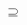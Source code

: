 \documentclass{standalone}
\newcommand*\zhparaleq{%
  \mathrel{\text{%
    \tikz[baseline]
      \draw (0em,0ex) -- (.8em,0ex)
            (0em,.35ex) -- (.8em,.35ex)
            (.24em,.45ex) -- (.37em,1.5ex)
            (.43em,.45ex) -- (.56em,1.5ex);}}}
\newcommand*\zhparalogram{%
  \mathord{\text{%
    \tikz[baseline]
      \draw (0,.1ex) -- (.8em,.1ex) -- (1em,1.4ex) -- (.2em,1.4ex) -- cycle;}}}
\newcommand*\zhsimilar{%
    \mathrel{\text{%
    \raisebox{0.1ex}{%
    \tikz \draw[baseline] (-.17em,.45ex) arc (90:180:0.23em and 0.45ex) arc (180:270:0.45ex) .. controls (0,-.45ex) and (0em,.45ex) .. (.21em,.45ex) arc (90:0:0.45ex) arc (0:-90:0.23em and 0.45ex);%
    }%
}}}
\newcommand*\zhcongruent{%
    \mathrel{\text{%
    \tikz \draw[baseline] (-.22em,-.4ex) arc (-90:-285:0.4ex) (-.22em,-.4ex) .. controls (0,-.4ex) and (0,.4ex) .. (.22em,.4ex) arc (90:-105:0.4ex) (-.4em,-.75ex) -- (.4em,-.75ex) (-.4em,-1.1ex) -- (.4em,-1.1ex);%
}}}
\renewcommand\zhparallel{%
	\mathrel{\text{\tikz[baseline]
			\draw (0em,-0.3ex) -- (.4em,1.7ex)
			(.2em,-0.3ex) -- (.6em,1.7ex);
}}}
\newcommand*\zhsubsetneqq{%
	\mathrel{\text{\tikz
		\draw[baseline] (.6636em,1.57ex) -- (.192em,1.57ex) arc (90:270:0.4022ex) -- (.6636em,.7674ex) (0,.2558ex) -- (.6636em,.2558ex) (0,.5116ex) -- (.6636em,.5116ex) (.2323em,0ex) -- (.4313em,.7674ex);%
}}%
}
\newcommand*\zhsubset{%
	\mathrel{\text{\raisebox{.15ex}{\tikz
		\draw[baseline] (.6636em,1.57ex) -- (.20235em,1.57ex) arc (90:270:0.4797ex) -- (.6636em,.61ex) (0,.305ex) -- (.6636em,.305ex);%
}}}%
}
\newcommand*\zhsupsetneqq{%
	\mathrel{\text{\tikz
		\draw[baseline] (-.6636em,1.57ex) -- (-.192em,1.57ex) arc (90:-90:0.4022ex) -- (-.6636em,.7674ex) (0,.2558ex) -- (-.6636em,.2558ex) (0,.5116ex) -- (-.6636em,.5116ex) (-.4313em,0ex) -- (-.2323em,.7674ex);%
	}}%
}
\newcommand*\zhsupset{%
	\mathrel{\text{\raisebox{.15ex}{\tikz
		\draw[baseline] (-.6636em,1.57ex) -- (-.20235em,1.57ex) arc (90:-90:0.4797ex) -- (-.6636em,.61ex) (-.6636em,.305ex) -- (0,.305ex);%
}}}%
}
\begin{document}
$\zhsupset$
\end{document}
